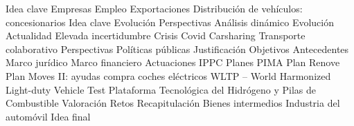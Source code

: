 \documentclass{nuevotema}
\begin{document}
\begin{esquema}[enumerate]
			\3 Idea clave
			\3 Empresas
			\3 Empleo
			\3 Exportaciones
		\2 Distribución de vehículos: concesionarios
			\3 Idea clave
			\3 Evolución
			\3 Perspectivas
		\2 Análisis dinámico
			\3 Evolución
			\3 Actualidad
			\3 Elevada incertidumbre
			\3 Crisis Covid
			\3 Carsharing
			\3 Transporte colaborativo
			\3 Perspectivas
		\2 Políticas públicas
			\3 Justificación
			\3 Objetivos
			\3 Antecedentes
			\3 Marco jurídico
			\3 Marco financiero
			\3 Actuaciones
			\3 IPPC
			\3 Planes PIMA
			\3 Plan Renove
			\3 Plan Moves II: ayudas compra coches eléctricos
			\3 WLTP -- World Harmonized Light-duty Vehicle Test
			\3 Plataforma Tecnológica del Hidrógeno y Pilas de Combustible
			\3 Valoración
			\3 Retos
	\1[] \marcar{Conclusión}
		\2 Recapitulación
			\3 Bienes intermedios
			\3 Industria del automóvil
		\2 Idea final

\end{esquema}

\esquemalargo
\end{document}
